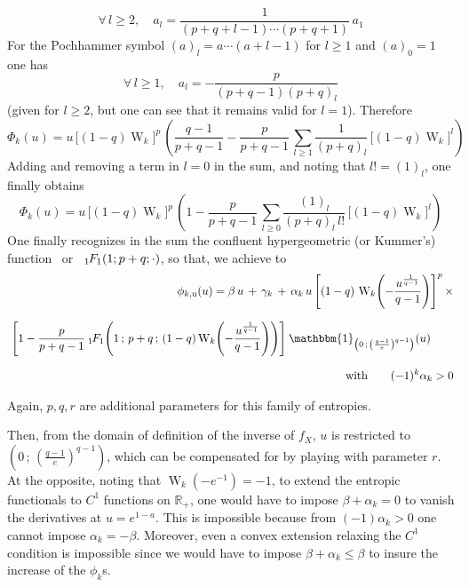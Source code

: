 \documentclass[entropy,article,submit,moreauthors,pdftex]{Definitions/mdpi}
\def\Rset{\mathbb{R}}%
\def\un{\mathbbm{1}}%
\def\W{\operatorname{W}} %
\newcommand{\hypgeom}[2]{\mbox{}_{#1}\hspace{-1pt}F_{#2}}%
\def\u{\mathrm{u}}
\begin{document}
%
\[
\forall \, l \ge 2, \quad a_l = \frac{1}{(p+q+l-1) \cdots (p+q+1)} \, a_1
\]
%
For the Pochhammer symbol $(a)_l = a \cdots (a+l-1)$ for $l \ge 1$ and $(a)_0 = 1$ one has 
%
\[
\forall \, l \ge 1, \quad a_l = - \frac{p}{(p+q-1) (p+q)_l}
\]
%
(given for $l \ge 2$, but one can see that it remains valid for $l = 1$). Therefore
%
\[
\Phi_k(u)  =  u  \,  \Big[  (1-q)  \W_k  \Big]^p  \,  \left(  \frac{q-1}{p+q-1}  -
\frac{p}{p+q-1} \, \sum_{l \ge 1}  \frac{1}{(p+q)_l} \, \Big[ (1-q) \W_k \Big]^l
\right)
\]
%
Adding and removing a term in $l = 0$  in the sum, and noting that $l! = (1)_l$,
one finally obtains
%
\[
\Phi_k(u) = u \, \Big[ (1-q) \W_k \Big]^p \, \left( 1 - \frac{p}{p+q-1} \, \sum_{l
  \ge 0} \frac{(1)_l}{(p+q)_l \, l!} \, \Big[ (1-q) \W_k \Big]^l \right)
\]
%
One finally recognizes in the sum the confluent hypergeometric (or Kummer's)
function~\cite[\S~13]{AbrSte70}  or~\cite[\S~9.2]{GraRyz15} $\hypgeom{1}{1}(1  ;
p+q ; \cdot)$, so that, we achieve to
%
\begin{eqnarray}
&&\phi_{k,\u}(u) = \beta \, u \, + \, \gamma_k \, + \, \alpha_k \, u \, \left[
  (1-q) \, \W_k\left( - \frac{u^{\frac{1}{q-1}}}{q-1}  \right)  \right]^p  \,  \times\nonumber
\\[2.5mm] &&\hspace{-2.5mm}\left[ 1 -  \frac{p}{p+q-1} \: \hypgeom{1}{1}\left( 1
  \, ; \, p+q \, ;  \, (1-q) \W_k \left( - \frac{u^{\frac{1}{q-1}}}{q-1} \right)
  \right) \right]  \: \un_{\left( 0  \, ; \, \left(  \frac{q-1}{e} \right)^{q-1}
  \right)}(u) \qquad
\\[2.5mm]
&&\mbox{with} \qquad (-1)^k  \alpha_k >  0 \nonumber
\end{eqnarray}

Again, $p, q, r$ are additional parameters for this family of entropies.

Then, from the domain  of definition of the inverse of  $f_X$, $u$ is restricted
to $\left( 0  \, ; \, \left( \frac{q-1}{e} \right)^{q-1}  \right)$, which can be
compensated for  by playing with  parameter $r$.   At the opposite,  noting that
$\W_k\left( -e^{-1} \right)  = -1$, to extend the entropic  functionals to $C^1$
functions on  $\Rset_+$, one  would have  to impose  $\beta +  \alpha_k =  0$ to
vanish the derivatives  at $u = e^{1-a}$. This is  impossible because from $(-1)
\alpha_k > 0$ one  cannot impose $\alpha_k = - \beta$.   Moreover, even a convex
extension relaxing  the $C^1$  condition is  impossible since  we would  have to
impose $\beta + \alpha_k \le \beta$ to insure the increase of the $\phi_k$s.
\end{document}
